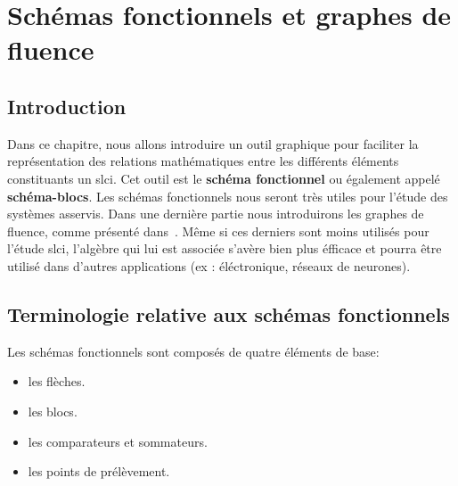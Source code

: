 \chapter[Schéma fonctionnels]{Schémas fonctionnels et graphes de fluence\label{chap-schemabloc}}

\minitoc
\newpage
\section{Introduction}
Dans ce chapitre, nous allons introduire un outil graphique pour faciliter 
la représentation des relations mathématiques entre les différents 
éléments constituants un \gls{slci}. Cet outil est le \textbf{schéma fonctionnel} ou 
également appelé \textbf{schéma-blocs}. Les schémas fonctionnels nous seront très 
utiles pour l'étude des systèmes asservis. Dans une dernière partie nous introduirons 
les graphes de fluence, comme présenté dans~\cite{Ostertag}. Même si ces derniers 
sont moins utilisés pour l'étude \gls{slci}, l'algèbre qui lui est 
associée s'avère bien plus éfficace et pourra être utilisé dans d'autres 
applications (ex : éléctronique, réseaux de neurones).


\section{Terminologie relative aux schémas fonctionnels}
Les schémas fonctionnels sont composés de quatre éléments de base:
\begin{itemize}
    \item les flèches.
    \item les blocs.
    \item les comparateurs et sommateurs.
    \item les points de prélèvement.
\end{itemize}

\newpage
